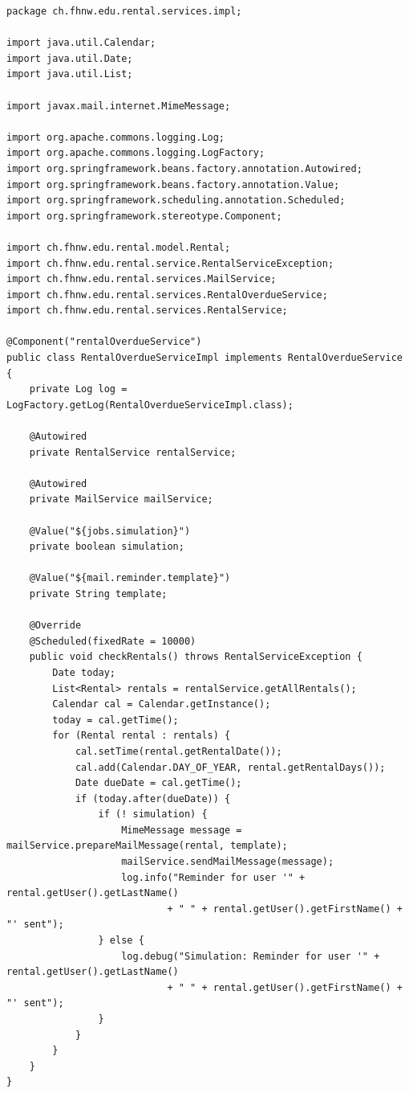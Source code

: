 \documentclass[a4paper,10pt]{scrreprt}
\begin{document}
\begin{lstlisting}[caption=RentalOverdueService]
 package ch.fhnw.edu.rental.services.impl;

import java.util.Calendar;
import java.util.Date;
import java.util.List;

import javax.mail.internet.MimeMessage;

import org.apache.commons.logging.Log;
import org.apache.commons.logging.LogFactory;
import org.springframework.beans.factory.annotation.Autowired;
import org.springframework.beans.factory.annotation.Value;
import org.springframework.scheduling.annotation.Scheduled;
import org.springframework.stereotype.Component;

import ch.fhnw.edu.rental.model.Rental;
import ch.fhnw.edu.rental.service.RentalServiceException;
import ch.fhnw.edu.rental.services.MailService;
import ch.fhnw.edu.rental.services.RentalOverdueService;
import ch.fhnw.edu.rental.services.RentalService;

@Component("rentalOverdueService")
public class RentalOverdueServiceImpl implements RentalOverdueService  {
	private Log log = LogFactory.getLog(RentalOverdueServiceImpl.class);

	@Autowired
	private RentalService rentalService;
	
	@Autowired
	private MailService mailService;
	
	@Value("${jobs.simulation}")
	private boolean simulation;
	
	@Value("${mail.reminder.template}")
	private String template;

	@Override
	@Scheduled(fixedRate = 10000)
	public void checkRentals() throws RentalServiceException {
		Date today;
		List<Rental> rentals = rentalService.getAllRentals();
		Calendar cal = Calendar.getInstance();
		today = cal.getTime();
		for (Rental rental : rentals) {
			cal.setTime(rental.getRentalDate());
			cal.add(Calendar.DAY_OF_YEAR, rental.getRentalDays());
			Date dueDate = cal.getTime();
			if (today.after(dueDate)) {
				if (! simulation) {
					MimeMessage message = mailService.prepareMailMessage(rental, template);
					mailService.sendMailMessage(message);
					log.info("Reminder for user '" + rental.getUser().getLastName()
							+ " " + rental.getUser().getFirstName()	+ "' sent");
				} else {
					log.debug("Simulation: Reminder for user '" + rental.getUser().getLastName()
							+ " " + rental.getUser().getFirstName()	+ "' sent");
				}
			}
		}
	}
}

\end{lstlisting}
\end{document}
